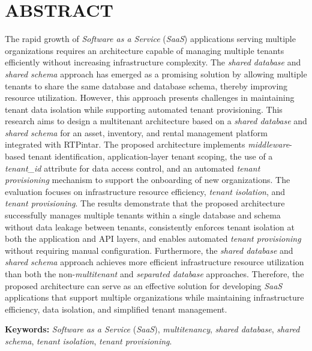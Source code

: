 \chapter*{ABSTRACT}

The rapid growth of \textit{Software as a Service} (\textit{SaaS}) applications serving multiple organizations requires an architecture capable of managing multiple tenants efficiently without increasing infrastructure complexity. The \textit{shared database} and \textit{shared schema} approach has emerged as a promising solution by allowing multiple tenants to share the same database and database schema, thereby improving resource utilization. However, this approach presents challenges in maintaining tenant data isolation while supporting automated tenant provisioning. This research aims to design a multitenant architecture based on a \textit{shared database} and \textit{shared schema} for an asset, inventory, and rental management platform integrated with RTPintar. The proposed architecture implements \textit{middleware}-based tenant identification, application-layer tenant scoping, the use of a \textit{tenant\_id} attribute for data access control, and an automated \textit{tenant provisioning} mechanism to support the onboarding of new organizations. The evaluation focuses on infrastructure resource efficiency, \textit{tenant isolation}, and \textit{tenant provisioning}. The results demonstrate that the proposed architecture successfully manages multiple tenants within a single database and schema without data leakage between tenants, consistently enforces tenant isolation at both the application and API layers, and enables automated \textit{tenant provisioning} without requiring manual configuration. Furthermore, the \textit{shared database} and \textit{shared schema} approach achieves more efficient infrastructure resource utilization than both the non-\textit{multitenant} and \textit{separated database} approaches. Therefore, the proposed architecture can serve as an effective solution for developing \textit{SaaS} applications that support multiple organizations while maintaining infrastructure efficiency, data isolation, and simplified tenant management.

\vspace{1cm}

\noindent\textbf{Keywords:} \textit{Software as a Service} (\textit{SaaS}), \textit{multitenancy}, \textit{shared database}, \textit{shared schema}, \textit{tenant isolation}, \textit{tenant provisioning}.
